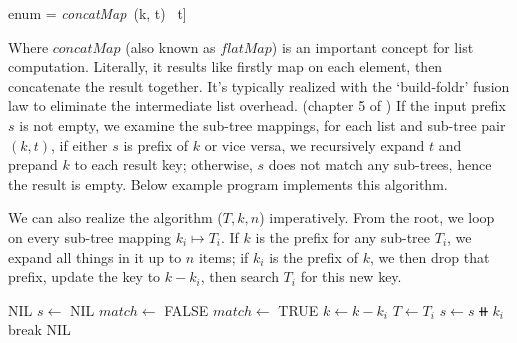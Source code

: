 \documentclass[b5paper]{article}
\begin{document}
\be
enum = \textit{concatMap}\ (k, t) \mapsto [(k \doubleplus a, b) | (a, b) \in startsWith\ [\ ]\ t]
\ee

\label{sec:list-concatmap}
Where $\textit{concatMap}$ (also known as $\textit{flatMap}$) is an important concept for list computation. Literally, it results like firstly map on each element, then concatenate the result together. It's typically realized with the `build-foldr' fusion law to eliminate the intermediate list overhead. (chapter 5 of \cite{unplugged}) If the input prefix $s$ is not empty, we examine the sub-tree mappings, for each list and sub-tree pair $(k, t)$, if either $s$ is prefix of $k$ or vice versa, we recursively expand $t$ and prepand $k$ to each result key; otherwise, $s$ does not match any sub-trees, hence the result is empty. Below example program implements this algorithm.


We can also realize the algorithm ($T, k, n$) imperatively. From the root, we loop on every sub-tree mapping $k_i \mapsto T_i$. If $k$ is the prefix for any sub-tree $T_i$, we expand all things in it up to $n$ items; if $k_i$ is the prefix of $k$, we then drop that prefix, update the key to $k - k_i$, then search $T_i$ for this new key.

\begin{algorithmic}[1]
     \State \Return NIL
  \EndIf
  \State $s \gets$ NIL
  \Repeat
    \State $match \gets$ FALSE
        \State \Return {}
      \EndIf
        \State $match \gets$ TRUE
        \State $k \gets k - k_i$  
        \State $T \gets T_i$
        \State $s \gets s \doubleplus k_i$
        \State break
      \EndIf
    \EndFor
  \State \Return NIL
\EndFunction
\end{algorithmic}
\end{document}
